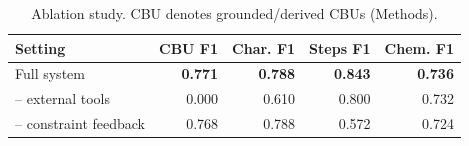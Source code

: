 


\begin{table}[hpbt]
\centering
\caption{Ablation study. CBU denotes grounded/derived CBUs (Methods).}
\label{tab:ablation}
\begin{tabular}{lrrrr}
\hline
Setting & CBU F1 & Char. F1 & Steps F1 & Chem. F1 \\
\hline
Full system & \textbf{0.771} & \textbf{0.788} & \textbf{0.843} & \textbf{0.736} \\
-- external tools & 0.000 & 0.610 & 0.800 & 0.732 \\
-- constraint feedback & 0.768 & 0.788 & 0.572 & 0.724 \\
\hline
\end{tabular}
\end{table}


